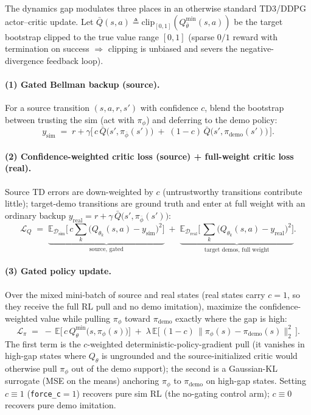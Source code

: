 \documentclass[11pt]{article}
\newcommand{\Dsim}{\mathcal{D}_{\mathrm{sim}}}
\newcommand{\Dreal}{\mathcal{D}_{\mathrm{real}}}
\newcommand{\pphi}{\pi_{\phi}}
\newcommand{\pdemo}{\pi_{\mathrm{demo}}}
\newcommand{\Qth}{Q_{\theta}}
\newcommand{\Qtt}{Q_{\bar{\theta}}}
\newcommand{\pbar}{\pi_{\bar{\phi}}}
\newcommand{\clip}[1]{\mathrm{clip}_{[0,1]}\!\left(#1\right)}
\begin{document}
The dynamics gap modulates three places in an otherwise standard TD3/DDPG
actor--critic update. Let $\bar{Q}(s,a)\triangleq\clip{\Qtt^{\min}(s,a)}$ be the
target bootstrap clipped to the true value range $[0,1]$ (sparse $0/1$ reward
with termination on success $\Rightarrow$ clipping is unbiased and severs the
negative-divergence feedback loop).

\paragraph{(1) Gated Bellman backup (source).}
For a source transition $(s,a,r,s')$ with confidence $c$, blend the bootstrap
between trusting the sim (act with $\pphi$) and deferring to the demo policy:
\begin{equation}
  y_{\mathrm{sim}} \;=\; r + \gamma\Big[\, c\,\bar{Q}\big(s',\pbar(s')\big)
  \;+\;(1-c)\,\bar{Q}\big(s',\pdemo(s')\big)\,\Big].
  \label{eq:simbackup}
\end{equation}

\paragraph{(2) Confidence-weighted critic loss (source) + full-weight critic
loss (real).}
Source TD errors are down-weighted by $c$ (untrustworthy transitions
contribute little); target-demo transitions are ground truth and enter at full
weight with an ordinary backup $y_{\mathrm{real}}=r+\gamma\,\bar{Q}\big(s',
\pbar(s')\big)$:
\begin{equation}
  \mathcal{L}_{Q} \;=\;
  \underbrace{\mathbb{E}_{\Dsim}\!\Big[\, c\!\sum_{k}\big(Q_{\theta_k}(s,a)-
  y_{\mathrm{sim}}\big)^{2}\Big]}_{\text{source, gated}}
  \;+\;
  \underbrace{\mathbb{E}_{\Dreal}\!\Big[\,\sum_{k}\big(Q_{\theta_k}(s,a)-
  y_{\mathrm{real}}\big)^{2}\Big]}_{\text{target demos, full weight}} .
  \label{eq:critic}
\end{equation}

\paragraph{(3) Gated policy update.}
Over the mixed mini-batch of source and real states (real states carry $c{=}1$,
so they receive the full RL pull and no demo imitation), maximize the
confidence-weighted value while pulling $\pphi$ toward $\pdemo$ exactly where
the gap is high:
\begin{equation}
  \mathcal{L}_{\pi} \;=\;
  -\,\mathbb{E}\big[\,c\,\Qth^{\min}\!\big(s,\pphi(s)\big)\big]
  \;+\;\lambda\,\mathbb{E}\big[\,(1-c)\,\big\lVert \pphi(s)-\pdemo(s)
  \big\rVert_2^{2}\,\big].
  \label{eq:actor}
\end{equation}
The first term is the $c$-weighted deterministic-policy-gradient pull (it
vanishes in high-gap states where $\Qth$ is ungrounded and the source-initialized
critic would otherwise pull $\pphi$ out of the demo support); the second is a
Gaussian-KL surrogate (MSE on the means) anchoring $\pphi$ to $\pdemo$ on
high-gap states. Setting $c\equiv1$ (\texttt{force\_c}$=1$) recovers pure sim RL
(the no-gating control arm); $c\equiv0$ recovers pure demo imitation.
\end{document}

